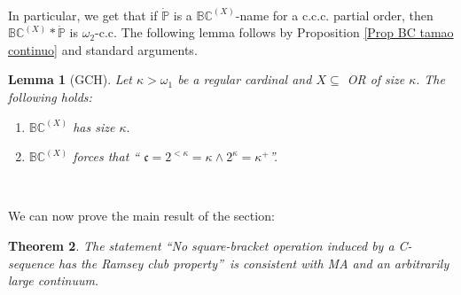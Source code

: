 \documentclass{article}
\newtheorem{theorem}{Theorem}
\newtheorem{lemma}[theorem]{Lemma}
\begin{document}
\qquad\qquad\ \ \ 

In particular, we get that if $\mathbb{\dot{P}}$ is a $\mathbb{BC}^{\left(
X\right)  }$-name for a \textsf{c.c.c.} partial order, then $\mathbb{BC}%
^{\left(  X\right)  }\ast\mathbb{\dot{P}}$ is $\omega_{2}$\textsf{-c.c. }The
following lemma follows by Proposition \ref{Prop BC tamao continuo} and
standard arguments.

\begin{lemma}
[\textsf{GCH}]Let $\kappa>\omega_{1}$ be a regular cardinal and $X\subseteq$
\textsf{OR }of size\textsf{ }$\kappa.$ The following holds:

\begin{enumerate}
\item $\mathbb{BC}^{\left(  X\right)  }$ has size $\kappa.$

\item $\mathbb{BC}^{\left(  X\right)  }$ forces that \textquotedblleft%
$\mathfrak{c}=2^{<\kappa}=\kappa\wedge2^{\kappa}=\kappa^{+}$\textquotedblright.
\end{enumerate}
\end{lemma}

\qquad\ \qquad\ \ \ \ \qquad\ \ \ \ 

We can now prove the main result of the section:

\begin{theorem}
The statement \textquotedblleft No square-bracket operation induced by a
\textsf{C}-sequence has the Ramsey club property\textquotedblright\ is
consistent with \textsf{MA }and an arbitrarily large continuum. \label{MA}
\end{theorem}
\end{document}
